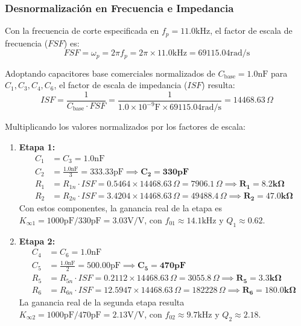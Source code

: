 \subsubsection{Desnormalización en Frecuencia e Impedancia}
Con la frecuencia de corte especificada en $f_p = 11.0 \unit{\kilo\hertz}$, el factor de escala de frecuencia ($FSF$) es:
\begin{equation*}
    FSF = \omega_p = 2\pi f_p = 2\pi \times 11.0 \unit{\kilo\hertz} = 69115.04 \unit{\radian\per\second}
\end{equation*}

Adoptando capacitores base comerciales normalizados de $C_{\text{base}} = 1.0 \unit{\nano\farad}$ para $C_1, C_3, C_4,
C_6$, el factor de escala de impedancia ($ISF$) resulta:
\begin{equation*}
    ISF = \frac{1}{C_{\text{base}} \cdot FSF} = \frac{1}{1.0 \times 10^{-9} \unit{\farad} \times 69115.04 \unit{\radian\per\second}} = 14468.63 \,\Omega
\end{equation*}

Multiplicando los valores normalizados por los factores de escala:
\begin{enumerate}
    \item \textbf{Etapa 1:}
        \begin{align*}
            C_1 &= C_3 = 1.0 \unit{\nano\farad} \\
            C_2 &= \frac{1.0 \unit{\nano\farad}}{3} = 333.33 \unit{\pico\farad} \implies \mathbf{C_2 = 330 \unit{\pico\farad}} \\
            R_1 &= R_{1n} \cdot ISF = 0.5464 \times 14468.63 \,\Omega = 7906.1 \,\Omega \implies \mathbf{R_1 = 8.2 \unit{\kilo\ohm}} \\
            R_2 &= R_{2n} \cdot ISF = 3.4204 \times 14468.63 \,\Omega = 49488.4 \,\Omega \implies \mathbf{R_2 = 47.0 \unit{\kilo\ohm}}
        \end{align*}
        Con estos componentes, la ganancia real de la etapa es $K_{\infty 1} = 1000\unit{\pico\farad} /
        330\unit{\pico\farad} = 3.03 \unit{\volt\per\volt}$, con $f_{01} \approx 14.1 \unit{\kilo\hertz}$ y $Q_1 \approx
        0.62$.

    \item \textbf{Etapa 2:}
        \begin{align*}
            C_4 &= C_6 = 1.0 \unit{\nano\farad} \\
            C_5 &= \frac{1.0 \unit{\nano\farad}}{2} = 500.00 \unit{\pico\farad} \implies \mathbf{C_5 = 470 \unit{\pico\farad}} \\
            R_5 &= R_{5n} \cdot ISF = 0.2112 \times 14468.63 \,\Omega = 3055.8 \,\Omega \implies \mathbf{R_5 = 3.3 \unit{\kilo\ohm}} \\
            R_6 &= R_{6n} \cdot ISF = 12.5947 \times 14468.63 \,\Omega = 182228 \,\Omega \implies \mathbf{R_6 = 180.0 \unit{\kilo\ohm}}
        \end{align*}
        La ganancia real de la segunda etapa resulta $K_{\infty 2} = 1000\unit{\pico\farad} / 470\unit{\pico\farad} =
        2.13 \unit{\volt\per\volt}$, con $f_{02} \approx 9.7 \unit{\kilo\hertz}$ y $Q_2 \approx 2.18$.
\end{enumerate}

